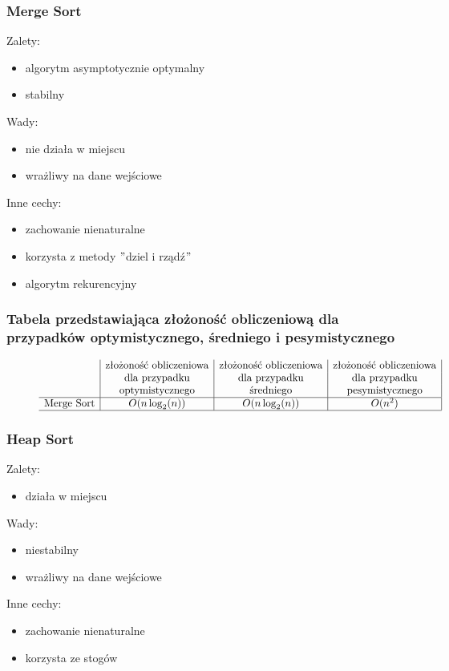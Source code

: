 \documentclass[polish,polish,a4paper]{article}
\begin{document}
\begin{spacing}{1.5}
			\subsubsection*{Merge Sort}
	Zalety:
	\begin{itemize}
		\item algorytm asymptotycznie optymalny
		\item stabilny
	\end{itemize}
	Wady:
	\begin{itemize}
		\item nie działa w miejscu
		\item wrażliwy na dane wejściowe
	\end{itemize}
	Inne cechy:
	\begin{itemize}
		\item zachowanie nienaturalne
		\item korzysta z metody $"$dziel i rządź$"$
		\item algorytm rekurencyjny
	\end{itemize}
	
	\subsubsection*{Tabela przedstawiająca złożoność obliczeniową dla przypadków optymistycznego, średniego i pesymistycznego} 
	\begin{figure}[H]
		
		\begin{equation*}
		\begin{array}{l|c|c|c|}

		&$złożoność obliczeniowa$&$złożoność obliczeniowa$&$złożoność obliczeniowa$\\
		&$dla przypadku$&$dla przypadku$&$dla przypadku$\\
		&$optymistycznego$&$średniego$&$pesymistycznego$\\
		\hline
		$Merge Sort$&O(n\log_{2}(n))&O(n\log_{2}(n))&O(n^2)\\
		\hline
		\end{array}
		\end{equation*}
	\end{figure}
	
			\subsubsection*{Heap Sort}
Zalety:
\begin{itemize}
	\item działa w miejscu
\end{itemize}
Wady:
\begin{itemize}
	\item niestabilny
	\item wrażliwy na dane wejściowe
\end{itemize}
Inne cechy:
\begin{itemize}
	\item zachowanie nienaturalne
	\item korzysta ze stogów
\end{itemize}


\end{spacing}
\end{document}
